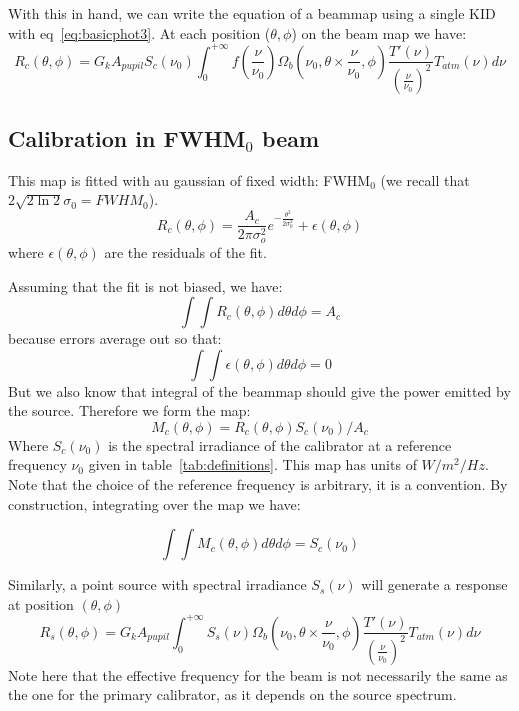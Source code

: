 With this in hand, we can write the equation of a beammap using a
single KID with eq~\ref{eq:basicphot3}. At each position ($\theta,
\phi$) on the beam map we have:
\begin{equation}
R_{c}(\theta, \phi) =  G_{k} A_{pupil} S_{c} (\nu_{0})  \int_{0}^{+\infty}
f(\frac{\nu}{\nu_{0}}) \Omega_{b}(\nu_{0}, \theta \times \frac{\nu}{\nu_{0}},
\phi) \frac{T'(\nu)}{\left(\frac{\nu}{\nu_{0}}\right)^{2}}
T_{atm}(\nu) d\nu
\label{eq:beammap}
\end{equation}

\subsection{Calibration in FWHM$_{0}$ beam}

This map is fitted with au gaussian of fixed width: FWHM$_{0}$ (we
recall that $2 \sqrt{2\ln{2}} \sigma_{0} =  FWHM_{0}$).
\begin{equation} 
R_{c}(\theta, \phi) = \frac{A_{c}}{2 \pi \sigma_{o}^{2}}
e^{-\frac{\theta^{2}}{2\sigma_{0}^{2}}}  + \epsilon(\theta, \phi)
\end{equation}
where $\epsilon(\theta, \phi)$ are the residuals of the fit.

Assuming that the fit is not biased, we have:
\begin{equation} 
\int\int R_{c}(\theta, \phi) d\theta d\phi = A_{c}
\end{equation}
because errors average out so that:
\begin{equation} 
\int\int \epsilon (\theta, \phi) d\theta d\phi = 0
\end{equation}
But we also know that integral of the beammap should give the power
emitted by the source. Therefore we form the map:
\begin{equation}
M_{c}(\theta, \phi) = R_{c}(\theta, \phi)   S_{c} (\nu_{0}) / A_{c}
\end{equation}
Where  $S_{c} (\nu_{0})$ is the spectral irradiance of the calibrator
at a reference frequency $\nu_{0}$ given in
table~\ref{tab:definitions}. This map has units of $W/m^{2}/Hz$. Note
that the choice of the reference frequency is arbitrary, it is a
convention. By construction, integrating over the map we have:

\begin{equation}
\int\int M_{c}(\theta, \phi) d\theta d\phi = S_{c}(\nu_{0})
\end{equation}



Similarly, a point source with spectral irradiance $S_{s}(\nu)$ will
generate a response at position $(\theta, \phi)$
\begin{equation}
R_{s}(\theta, \phi) =  G_{k} A_{pupil}  \int_{0}^{+\infty}
S_{s}(\nu) \Omega_{b}(\nu_{0}, \theta \times \frac{\nu}{\nu_{0}},
\phi) \frac{T'(\nu)}{\left(\frac{\nu}{\nu_{0}}\right)^{2}}
T_{atm}(\nu) d\nu
\end{equation}
Note here that the effective frequency for the beam is not necessarily
the same as the one for the primary calibrator, as it depends on the
source spectrum.


